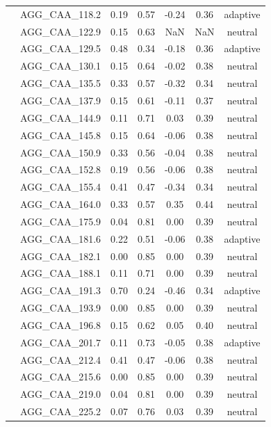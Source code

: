 \documentclass[11pt,]{article}
\begin{document}
\begin{longtable}[c]{@{}lcccccc@{}}
& AGG\_CAA\_118.2 & 0.19 & 0.57 & -0.24 & 0.36 & adaptive
\\\addlinespace
& AGG\_CAA\_122.9 & 0.15 & 0.63 & NaN & NaN & neutral
\\\addlinespace
& AGG\_CAA\_129.5 & 0.48 & 0.34 & -0.18 & 0.36 & adaptive
\\\addlinespace
& AGG\_CAA\_130.1 & 0.15 & 0.64 & -0.02 & 0.38 & neutral
\\\addlinespace
& AGG\_CAA\_135.5 & 0.33 & 0.57 & -0.32 & 0.34 & neutral
\\\addlinespace
& AGG\_CAA\_137.9 & 0.15 & 0.61 & -0.11 & 0.37 & neutral
\\\addlinespace
& AGG\_CAA\_144.9 & 0.11 & 0.71 & 0.03 & 0.39 & neutral
\\\addlinespace
& AGG\_CAA\_145.8 & 0.15 & 0.64 & -0.06 & 0.38 & neutral
\\\addlinespace
& AGG\_CAA\_150.9 & 0.33 & 0.56 & -0.04 & 0.38 & neutral
\\\addlinespace
& AGG\_CAA\_152.8 & 0.19 & 0.56 & -0.06 & 0.38 & neutral
\\\addlinespace
& AGG\_CAA\_155.4 & 0.41 & 0.47 & -0.34 & 0.34 & neutral
\\\addlinespace
& AGG\_CAA\_164.0 & 0.33 & 0.57 & 0.35 & 0.44 & neutral
\\\addlinespace
& AGG\_CAA\_175.9 & 0.04 & 0.81 & 0.00 & 0.39 & neutral
\\\addlinespace
& AGG\_CAA\_181.6 & 0.22 & 0.51 & -0.06 & 0.38 & adaptive
\\\addlinespace
& AGG\_CAA\_182.1 & 0.00 & 0.85 & 0.00 & 0.39 & neutral
\\\addlinespace
& AGG\_CAA\_188.1 & 0.11 & 0.71 & 0.00 & 0.39 & neutral
\\\addlinespace
& AGG\_CAA\_191.3 & 0.70 & 0.24 & -0.46 & 0.34 & adaptive
\\\addlinespace
& AGG\_CAA\_193.9 & 0.00 & 0.85 & 0.00 & 0.39 & neutral
\\\addlinespace
& AGG\_CAA\_196.8 & 0.15 & 0.62 & 0.05 & 0.40 & neutral
\\\addlinespace
& AGG\_CAA\_201.7 & 0.11 & 0.73 & -0.05 & 0.38 & adaptive
\\\addlinespace
& AGG\_CAA\_212.4 & 0.41 & 0.47 & -0.06 & 0.38 & neutral
\\\addlinespace
& AGG\_CAA\_215.6 & 0.00 & 0.85 & 0.00 & 0.39 & neutral
\\\addlinespace
& AGG\_CAA\_219.0 & 0.04 & 0.81 & 0.00 & 0.39 & neutral
\\\addlinespace
& AGG\_CAA\_225.2 & 0.07 & 0.76 & 0.03 & 0.39 & neutral

\end{longtable}
\end{document}

